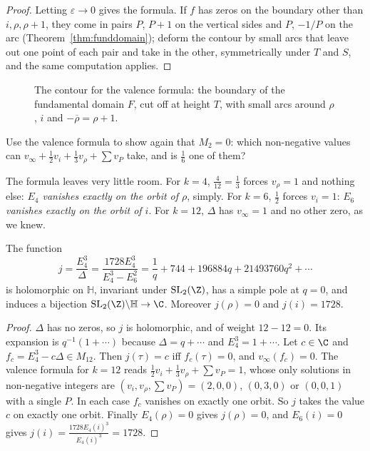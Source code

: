 \begin{proof}
Letting $\varepsilon\to0$ gives the formula. If $f$ has zeros on the boundary other than $i,\rho,\rho+1$, they come in pairs $P$, $P+1$ on the vertical sides and
$P$, $-1/P$ on the arc (Theorem~\ref{thm:funddomain}); deform the contour by small arcs that leave out one point of each pair and take in the other, symmetrically
under $T$ and $S$, and the same computation applies.
\end{proof}

\begin{figure}[ht]
\centering{}
\caption{The contour for the valence formula: the boundary of the fundamental domain $F$, cut off at height $T$, with small arcs around $\rho$, $i$ and $-\overline\rho=\rho+1$.}
\label{fig:contour}
\end{figure}

\begin{think}
Use the valence formula to show again that $M_2=0$: which non-negative values can $v_\infty+\frac12v_i+\frac13v_\rho+\sum v_P$ take, and is $\frac16$ one of them?
\end{think}

The formula leaves very little room. For $k=4$, $\frac4{12}=\frac13$ forces $v_\rho=1$ and nothing else: \emph{$E_4$ vanishes exactly on the orbit of $\rho$}, simply. For
$k=6$, $\frac12$ forces $v_i=1$: \emph{$E_6$ vanishes exactly on the orbit of $i$}. For $k=12$, $\Delta$ has $v_\infty=1$ and no other zero, as we knew.

\begin{theorem}\label{thm:jinv}
The function
\[
j=\frac{E_4^3}\Delta=\frac{1728E_4^3}{E_4^3-E_6^2}=\frac1q+744+196884q+21493760q^2+\cdots
\]
is holomorphic on $\mathbb H$, invariant under $\mathrm{SL}_2(\Z)$, has a simple pole at $q=0$, and induces a bijection $\mathrm{SL}_2(\Z)\backslash\mathbb H\to\C$. Moreover
$j(\rho)=0$ and $j(i)=1728$.
\end{theorem}
\begin{proof}
$\Delta$ has no zeros, so $j$ is holomorphic, and of weight $12-12=0$. Its expansion is $q^{-1}(1+\cdots)$ because $\Delta=q+\cdots$ and $E_4^3=1+\cdots$. Let
$c\in\C$ and $f_c=E_4^3-c\Delta\in M_{12}$. Then $j(\tau)=c$ iff $f_c(\tau)=0$, and $v_\infty(f_c)=0$. The valence formula for $k=12$ reads
$\frac12v_i+\frac13v_\rho+\sum v_P=1$, whose only solutions in non-negative integers are $(v_i,v_\rho,\sum v_P)=(2,0,0)$, $(0,3,0)$ or $(0,0,1)$ with a single
$P$. In each case $f_c$ vanishes on exactly one orbit. So $j$ takes the value $c$ on exactly one orbit. Finally $E_4(\rho)=0$ gives $j(\rho)=0$, and $E_6(i)=0$ gives
$j(i)=\frac{1728E_4(i)^3}{E_4(i)^3}=1728$.
\end{proof}

